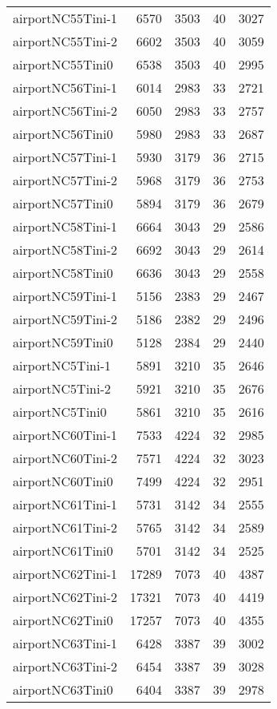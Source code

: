 \begin{longtable}{lrrrr}
airportNC55Tini-1 & 6570 & 3503 & 40 & 3027 \\
airportNC55Tini-2 & 6602 & 3503 & 40 & 3059 \\
airportNC55Tini0 & 6538 & 3503 & 40 & 2995 \\
airportNC56Tini-1 & 6014 & 2983 & 33 & 2721 \\
airportNC56Tini-2 & 6050 & 2983 & 33 & 2757 \\
airportNC56Tini0 & 5980 & 2983 & 33 & 2687 \\
airportNC57Tini-1 & 5930 & 3179 & 36 & 2715 \\
airportNC57Tini-2 & 5968 & 3179 & 36 & 2753 \\
airportNC57Tini0 & 5894 & 3179 & 36 & 2679 \\
airportNC58Tini-1 & 6664 & 3043 & 29 & 2586 \\
airportNC58Tini-2 & 6692 & 3043 & 29 & 2614 \\
airportNC58Tini0 & 6636 & 3043 & 29 & 2558 \\
airportNC59Tini-1 & 5156 & 2383 & 29 & 2467 \\
airportNC59Tini-2 & 5186 & 2382 & 29 & 2496 \\
airportNC59Tini0 & 5128 & 2384 & 29 & 2440 \\
airportNC5Tini-1 & 5891 & 3210 & 35 & 2646 \\
airportNC5Tini-2 & 5921 & 3210 & 35 & 2676 \\
airportNC5Tini0 & 5861 & 3210 & 35 & 2616 \\
airportNC60Tini-1 & 7533 & 4224 & 32 & 2985 \\
airportNC60Tini-2 & 7571 & 4224 & 32 & 3023 \\
airportNC60Tini0 & 7499 & 4224 & 32 & 2951 \\
airportNC61Tini-1 & 5731 & 3142 & 34 & 2555 \\
airportNC61Tini-2 & 5765 & 3142 & 34 & 2589 \\
airportNC61Tini0 & 5701 & 3142 & 34 & 2525 \\
airportNC62Tini-1 & 17289 & 7073 & 40 & 4387 \\
airportNC62Tini-2 & 17321 & 7073 & 40 & 4419 \\
airportNC62Tini0 & 17257 & 7073 & 40 & 4355 \\
airportNC63Tini-1 & 6428 & 3387 & 39 & 3002 \\
airportNC63Tini-2 & 6454 & 3387 & 39 & 3028 \\
airportNC63Tini0 & 6404 & 3387 & 39 & 2978 \\

\end{longtable}
